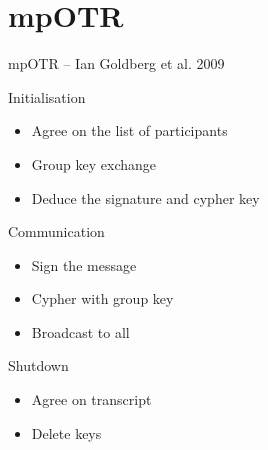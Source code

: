 \documentclass{beamer}
\begin{document}


\section{mpOTR}
\begin{frame}{mpOTR – Ian Goldberg et al. 2009 \cite{mpotr}}
	\begin{block}{Initialisation}
		\begin{itemize}
			\item Agree on the list of participants
			\item Group key exchange
			\item Deduce the signature and cypher key
		\end{itemize}
  \end{block}

	\begin{block}{Communication}
		\begin{itemize}
			\item Sign the message
			\item Cypher with group key
			\item Broadcast to all
		\end{itemize}
  \end{block}

	\begin{block}{Shutdown}
		\begin{itemize}
			\item Agree on transcript
			\item Delete keys
		\end{itemize}
  \end{block}
\end{frame}
\end{document}
